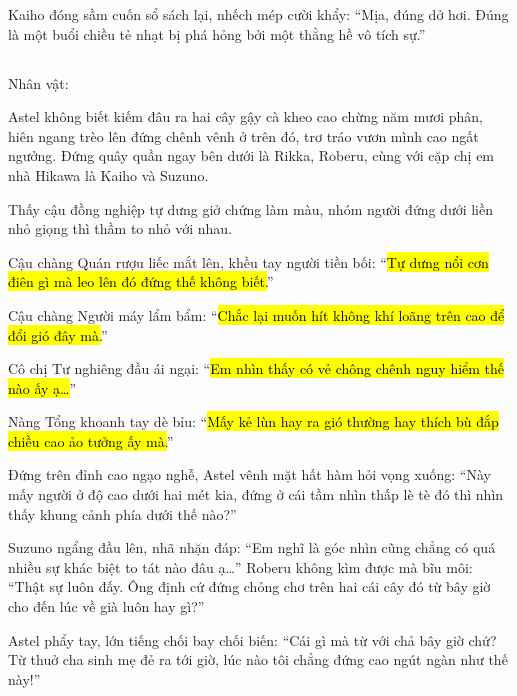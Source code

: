 \documentclass[../main.tex]{subfiles}
\begin{document}
Kaiho đóng sầm cuốn sổ sách lại, nhếch mép cười khẩy: ``Mịa, đúng dở hơi. Đúng là một buổi chiều tẻ nhạt bị phá hỏng bởi một thằng hề vô tích sự.''

\newpage

\subsection*{\label{ep-M34.II}}
\vspace{-4pt}
\begin{center}
    {\caviar\fontsize{12pt}{12pt}\selectfont Nhân vật:     }
\end{center}

Astel không biết kiếm đâu ra hai cây gậy cà kheo cao chừng năm mươi phân, hiên ngang trèo lên đứng chênh vênh ở trên đó, trơ tráo vươn mình cao ngất ngưởng. Đứng quây quần ngay bên dưới là Rikka, Roberu, cùng với cặp chị em nhà Hikawa là Kaiho và Suzuno.


Thấy cậu đồng nghiệp tự dưng giở chứng làm màu, nhóm người đứng dưới liền nhỏ giọng thì thầm to nhỏ với nhau.

Cậu chàng Quán rượu liếc mắt lên, khều tay người tiền bối: ``\hl{Tự dưng nổi cơn điên gì mà leo lên đó đứng thế không biết.}''

Cậu chàng Người máy lẩm bẩm: ``\hl{Chắc lại muốn hít không khí loãng trên cao để đổi gió đây mà.}''

Cô chị Tư nghiêng đầu ái ngại: ``\hl{Em nhìn thấy có vẻ chông chênh nguy hiểm thế nào ấy ạ\dots}''

Nàng Tổng khoanh tay dè bỉu: ``\hl{Mấy kẻ lùn hay ra gió thường hay thích bù đắp chiều cao ảo tưởng ấy mà.}''

Đứng trên đỉnh cao ngạo nghễ, Astel vênh mặt hất hàm hỏi vọng xuống: ``Này mấy người ở độ cao dưới hai mét kia, đứng ở cái tầm nhìn thấp lè tè đó thì nhìn thấy khung cảnh phía dưới thế nào?''

Suzuno ngẩng đầu lên, nhã nhặn đáp: ``Em nghĩ là góc nhìn cũng chẳng có quá nhiều sự khác biệt to tát nào đâu ạ\dots'' Roberu không kìm được mà bĩu môi: ``Thật sự luôn đấy. Ông định cứ đứng chỏng chơ trên hai cái cây đó từ bây giờ cho đến lúc về già luôn hay gì?''

Astel phẩy tay, lớn tiếng chối bay chối biến: ``Cái gì mà từ với chả bây giờ chứ? Từ thuở cha sinh mẹ đẻ ra tới giờ, lúc nào tôi chẳng đứng cao ngút ngàn như thế này!''
\end{document}
